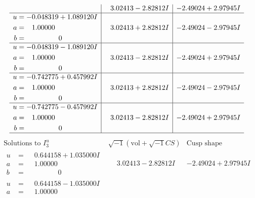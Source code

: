\documentclass[1p]{elsarticle_modified}
\theoremstyle{definition}
\newcommand{\I}{\sqrt{-1}}
\begin{document}
$$\begin{array}{c|c|c}
 & \phantom{-}3.02413 - 2.82812 I & -2.49024 + 2.97945 I \\ \hline\begin{aligned}
u &= -0.048319 + 1.089120 I \\
a &= \phantom{-}1.00000\phantom{ +0.000000I} \\
b &= \phantom{-0.000000 } 0\end{aligned}
 & \phantom{-}3.02413 + 2.82812 I & -2.49024 - 2.97945 I \\ \hline\begin{aligned}
u &= -0.048319 - 1.089120 I \\
a &= \phantom{-}1.00000\phantom{ +0.000000I} \\
b &= \phantom{-0.000000 } 0\end{aligned}
 & \phantom{-}3.02413 - 2.82812 I & -2.49024 + 2.97945 I \\ \hline\begin{aligned}
u &= -0.742775 + 0.457992 I \\
a &= \phantom{-}1.00000\phantom{ +0.000000I} \\
b &= \phantom{-0.000000 } 0\end{aligned}
 & \phantom{-}3.02413 + 2.82812 I & -2.49024 - 2.97945 I \\ \hline\begin{aligned}
u &= -0.742775 - 0.457992 I \\
a &= \phantom{-}1.00000\phantom{ +0.000000I} \\
b &= \phantom{-0.000000 } 0\end{aligned}
 & \phantom{-}3.02413 - 2.82812 I & -2.49024 + 2.97945 I\\
 \hline 
 \end{array}$$\newpage$$\begin{array}{c|c|c}  
\text{Solutions to }I^u_{3}& \I (\text{vol} + \sqrt{-1}CS) & \text{Cusp shape}\\
 \hline 
\begin{aligned}
u &= \phantom{-}0.644158 + 1.035000 I \\
a &= \phantom{-}1.00000\phantom{ +0.000000I} \\
b &= \phantom{-0.000000 } 0\end{aligned}
 & \phantom{-}3.02413 - 2.82812 I & -2.49024 + 2.97945 I \\ \hline\begin{aligned}
u &= \phantom{-}0.644158 - 1.035000 I \\
a &= \phantom{-}1.00000\phantom{ +0.000000I} \\

\end{aligned}
\end{array}$$
\end{document}
